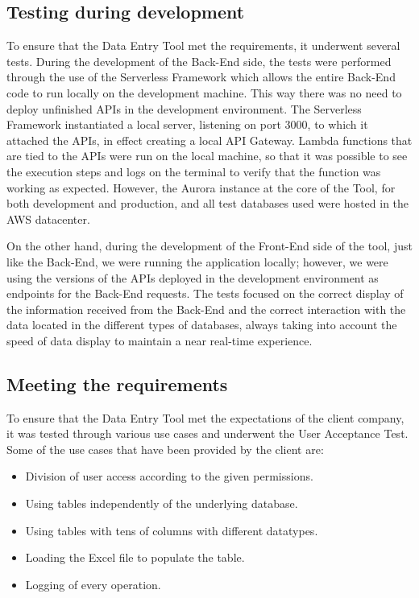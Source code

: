 \subsection{Testing during development}
To ensure that the Data Entry Tool met the requirements, it underwent several tests. During the development of the Back-End side, the tests were performed through the use of the Serverless Framework which allows the entire Back-End code to run locally on the development machine. This way there was no need to deploy unfinished APIs in the development environment. The Serverless Framework instantiated a local server, listening on port 3000, to which it attached the APIs, in effect creating a local API Gateway. Lambda functions that are tied to the APIs were run on the local machine, so that it was possible to see the execution steps and logs on the terminal to verify that the function was working as expected.  However, the Aurora instance at the core of the Tool, for both development and production, and all test databases used were hosted in the AWS datacenter.

On the other hand, during the development of the Front-End side of the tool, just like the Back-End, we were running the application locally; however, we were using the versions of the APIs deployed in the development environment as endpoints for the Back-End requests. The tests focused on the correct display of the information received from the Back-End and the correct interaction with the data located in the different types of databases, always taking into account the speed of data display to maintain a near real-time experience.


\subsection{Meeting the requirements}
To ensure that the Data Entry Tool met the expectations of the client company, it was tested through various use cases and underwent the User Acceptance Test. Some of the use cases that have been provided by the client are:

\begin{itemize}
    \item Division of user access according to the given permissions.
    \item Using tables independently of the underlying database.
    \item Using tables with tens of columns with different datatypes.
    \item Loading the Excel file to populate the table.
    \item Logging of every operation.
\end{itemize}

